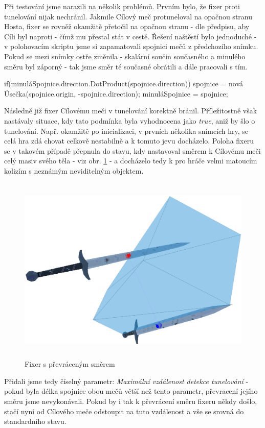 Při testování jsme narazili na několik problémů. Prvním bylo, že fixer proti tunelování nijak nechránil. Jakmile Cílový meč protuneloval na opačnou stranu Hosta, fixer se rovněž okamžitě přetočil na opačnou stranu - dle předpisu, aby Cíli byl naproti - čímž mu přestal stát v cestě. Řešení naštěstí bylo jednoduché - v polohovacím skriptu jsme si zapamatovali spojnici mečů z předchozího snímku. Pokud se mezi snímky ostře změnila - skalární součin současného a minulého směru byl záporný - tak jsme směr té současné obrátili a dále pracovali s tím.
\begin{code}
  if(minuláSpojnice.direction.DotProduct(spojnice.direction))
    spojnice = nová Úsečka(spojnice.origin, -spojnice.direction);
  minuláSpojnice = spojnice;
\end{code}
Následně již fixer Cílovému meči v tunelování korektně bránil. Příležitostně však nastávaly situace, kdy tato podmínka byla vyhodnocena jako \textit{true}, aniž by šlo o tunelování. Např. okamžitě po inicializaci, v prvních několika snímcích hry, se celá hra zdá chovat celkově nestabilně a k tomuto jevu docházelo. Poloha fixeru se v takovém případě přepnula do stavu, kdy nastavoval směrem k Cílovému meči celý masiv svého těla - viz obr. \ref{obr05:fixerOverturned} - a docházelo tedy k pro hráče velmi matoucím kolizím s neznámým neviditelným objektem. 

\begin{figure}[ht]\centering
  \center
  \includegraphics[height=90mm]{../img/fixerOverturned.png}
  \caption{Fixer s převráceným směrem}
  \label{obr05:fixerOverturned}
\end{figure} 

Přidali jsme tedy číselný parametr: \textit{Maximální vzdálenost detekce tunelování} - pokud byla délka spojnice obou mečů větší než tento parametr, převracení jejího směru jsme nevykonávali. Pokud by i tak k převrácení směru fixeru někdy došlo, stačí nyní od Cílového meče odstoupit na tuto vzdálenost a vše se srovná do standardního stavu. 

